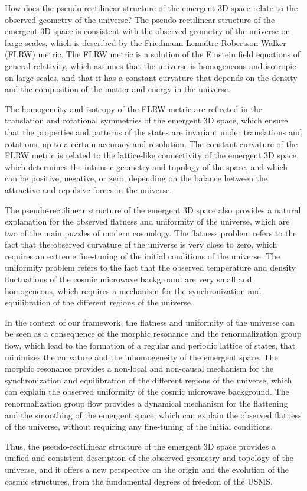 \begin{tcolorbox}[colback=green!5!white,colframe=green!75!black,title=Question]
    How does the pseudo-rectilinear structure of the emergent 3D space relate to the observed geometry of the universe?
    \tcblower
    The pseudo-rectilinear structure of the emergent 3D space is consistent with the observed geometry of the universe on large scales, which is described by the Friedmann-Lemaître-Robertson-Walker (FLRW) metric. The FLRW metric is a solution of the Einstein field equations of general relativity, which assumes that the universe is homogeneous and isotropic on large scales, and that it has a constant curvature that depends on the density and the composition of the matter and energy in the universe.

    The homogeneity and isotropy of the FLRW metric are reflected in the translation and rotational symmetries of the emergent 3D space, which ensure that the properties and patterns of the states are invariant under translations and rotations, up to a certain accuracy and resolution. The constant curvature of the FLRW metric is related to the lattice-like connectivity of the emergent 3D space, which determines the intrinsic geometry and topology of the space, and which can be positive, negative, or zero, depending on the balance between the attractive and repulsive forces in the universe.

    The pseudo-rectilinear structure of the emergent 3D space also provides a natural explanation for the observed flatness and uniformity of the universe, which are two of the main puzzles of modern cosmology. The flatness problem refers to the fact that the observed curvature of the universe is very close to zero, which requires an extreme fine-tuning of the initial conditions of the universe. The uniformity problem refers to the fact that the observed temperature and density fluctuations of the cosmic microwave background are very small and homogeneous, which requires a mechanism for the synchronization and equilibration of the different regions of the universe.

    In the context of our framework, the flatness and uniformity of the universe can be seen as a consequence of the morphic resonance and the renormalization group flow, which lead to the formation of a regular and periodic lattice of states, that minimizes the curvature and the inhomogeneity of the emergent space. The morphic resonance provides a non-local and non-causal mechanism for the synchronization and equilibration of the different regions of the universe, which can explain the observed uniformity of the cosmic microwave background. The renormalization group flow provides a dynamical mechanism for the flattening and the smoothing of the emergent space, which can explain the observed flatness of the universe, without requiring any fine-tuning of the initial conditions.

    Thus, the pseudo-rectilinear structure of the emergent 3D space provides a unified and consistent description of the observed geometry and topology of the universe, and it offers a new perspective on the origin and the evolution of the cosmic structures, from the fundamental degrees of freedom of the USMS.
\end{tcolorbox}

